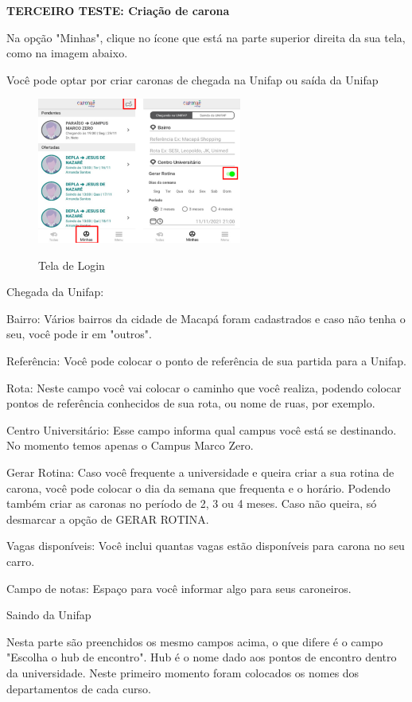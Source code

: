 \textbf{TERCEIRO TESTE: Criação de carona}

Na opção "Minhas", clique no ícone que está na parte superior direita da sua tela, como na imagem abaixo.

Você pode optar por criar caronas de chegada na Unifap ou saída da Unifap

\begin{figure}[H]
	\centering
	\caption{Tela de Login}
	\includegraphics[width=0.6\textwidth]{./04-figuras/manual/criacao_de_carona.png}
	\label{fig:criacao_de_carona}
\end{figure}

Chegada da Unifap:

Bairro: Vários bairros da cidade de Macapá foram cadastrados e caso não tenha o seu,
você pode ir em "outros".

Referência: Você pode colocar o ponto de referência de sua partida para a Unifap.

Rota: Neste campo você vai colocar o caminho que você realiza, podendo colocar pontos
de referência conhecidos de sua rota, ou nome de ruas, por exemplo.

Centro Universitário: Esse campo informa qual campus você está se destinando. No
momento temos apenas o Campus Marco Zero.

Gerar Rotina: Caso você frequente a universidade e queira criar a sua rotina de carona,
você pode colocar o dia da semana que frequenta e o horário. Podendo também criar as
caronas no período de 2, 3 ou 4 meses. Caso não queira, só desmarcar a opção de GERAR
ROTINA.

Vagas disponíveis: Você inclui quantas vagas estão disponíveis para carona no seu
carro.

Campo de notas: Espaço para você informar algo para seus caroneiros.

Saindo da Unifap

Nesta parte são preenchidos os mesmo campos acima, o que difere é o campo "Escolha
o hub de encontro". Hub é o nome dado aos pontos de encontro dentro da
universidade. Neste primeiro momento foram colocados os nomes dos departamentos de
cada curso.

